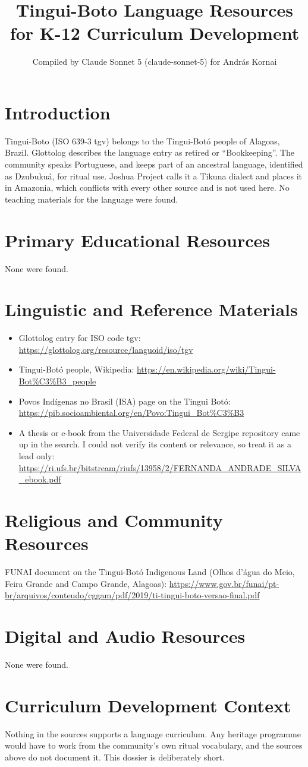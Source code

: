 \documentclass[12pt]{article}
\title{Tingui-Boto Language Resources for K-12 Curriculum Development}
\author{Compiled by Claude Sonnet 5 (claude-sonnet-5) for Andr\'as Kornai}
\date{}
\begin{document}
\maketitle

\section{Introduction}
Tingui-Boto (ISO 639-3 tgv) belongs to the Tingui-Bot\'o people of Alagoas, Brazil. Glottolog describes the language entry as retired or ``Bookkeeping''. The community speaks Portuguese, and keeps part of an ancestral language, identified as Dzubukuá, for ritual use. Joshua Project calls it a Tikuna dialect and places it in Amazonia, which conflicts with every other source and is not used here. No teaching materials for the language were found.

\section{Primary Educational Resources}
None were found.

\section{Linguistic and Reference Materials}
\begin{itemize}
\item Glottolog entry for ISO code tgv: \url{https://glottolog.org/resource/languoid/iso/tgv}
\item Tingui-Bot\'o people, Wikipedia: \url{https://en.wikipedia.org/wiki/Tingui-Bot%C3%B3_people}
\item Povos Ind\'igenas no Brasil (ISA) page on the Tingui Bot\'o: \url{https://pib.socioambiental.org/en/Povo:Tingui_Bot%C3%B3}
\item A thesis or e-book from the Universidade Federal de Sergipe repository came up in the search. I could not verify its content or relevance, so treat it as a lead only: \url{https://ri.ufs.br/bitstream/riufs/13958/2/FERNANDA_ANDRADE_SILVA_ebook.pdf}
\end{itemize}

\section{Religious and Community Resources}
FUNAI document on the Tingui-Bot\'o Indigenous Land (Olhos d'\'agua do Meio, Feira Grande and Campo Grande, Alagoas): \url{https://www.gov.br/funai/pt-br/arquivos/conteudo/cggam/pdf/2019/ti-tingui-boto-versao-final.pdf}

\section{Digital and Audio Resources}
None were found.

\section{Curriculum Development Context}
Nothing in the sources supports a language curriculum. Any heritage programme would have to work from the community's own ritual vocabulary, and the sources above do not document it. This dossier is deliberately short.
\end{document}
